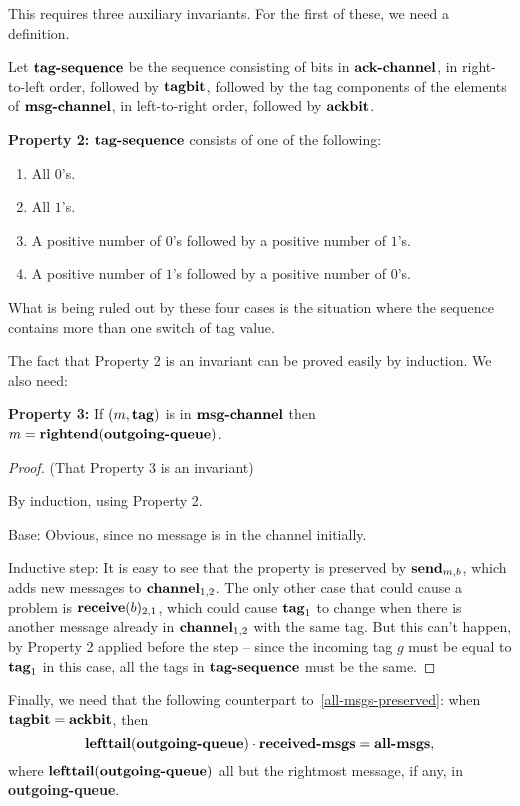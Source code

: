 This requires three auxiliary invariants.
For the first of these, we need a definition.

Let $\text{\textbf{tag-sequence}}$ be the sequence consisting of bits in
$\text{\textbf{ack-channel}}$, in right-to-left order, 
followed by $\text{\textbf{tagbit}}$, 
followed by the tag components of the elements of
$\text{\textbf{msg-channel}}$, in left-to-right order, 
followed by $\text{\textbf{ackbit}}$. 

{\bf Property 2:}
$\text{\textbf{tag-sequence}}$ consists of one of the following:
\begin{enumerate}
\item
All $0$'s.
\item
All $1$'s. 
\item
A positive number of $0$'s followed by a positive number of $1$'s.
\item
A positive number of $1$'s followed by a positive number of $0$'s.
\end{enumerate}
What is being ruled out by these four cases is the situation where
the sequence contains more than one switch of tag value. 

The fact that Property 2 is an invariant can be proved easily by
induction.  We also need: 

{\bf Property 3:}
If $(m,\text{\textbf{tag}})$ is in $\text{\textbf{msg-channel}}$ then $m =
\text{\textbf{rightend}}(\text{\textbf{outgoing-queue}})$. \\

\begin{proof}
(That Property 3 is an invariant)

By induction, using Property 2. 

Base: Obvious, since no message is in the channel initially. 

Inductive step: It is easy to see that the property is preserved by
$\text{\textbf{send}}_{m,b}$, which adds new messages to $\text{\textbf{channel}}_{1,2}$.
The only other case that could cause a problem is
$\text{\textbf{receive}}(b)_{2,1}$,
which could cause $\text{\textbf{tag}}_1$ to change when there is another message
already in $\text{\textbf{channel}}_{1,2}$ with the same tag. 
But this can't happen, by Property 2 applied before the step -- since
the incoming tag $g$ must be equal to $\text{\textbf{tag}}_1$ in this case,
all the tags in $\text{\textbf{tag-sequence}}$ must be the same.
\end{proof}

Finally, we need that the following counterpart
to~\eqref{all-msgs-preserved}: when $\text{\textbf{tagbit}} =
\text{\textbf{ackbit}}$, then
\begin{equation}\label{all-msgs-preserved2}
\text{\textbf{lefttail}(\textbf{outgoing-queue})}\cdot \text{\textbf{received-msgs}} =
\text{\textbf{all-msgs}},
\end{equation}
where $\text{\textbf{lefttail}}(\textbf{outgoing-queue})$ all but the
rightmost message, if any, in \textbf{outgoing-queue}.

